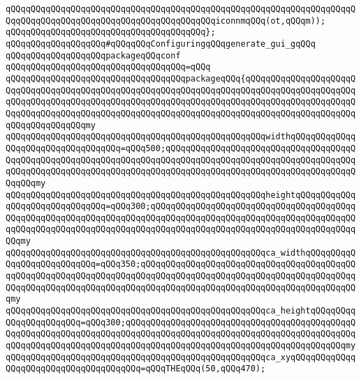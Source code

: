 \verb|qQQqqQQqqQQqqQQqqQQqqQQqqQQqqQQqqQQqqQQqqQQqqQQqqQQqqQQqqQQqqQQqqQQqqQQqqQQqqQQqqQQqqQQqqQQqqQQqqQQqqQQqqQQqqQQqiconnmqQQq(ot,qQQqm));|\newline
\verb|qQQqqQQqqQQqqQQqqQQqqQQqqQQqqQQqqQQqqQQq};|\newline
\newline
\verb|qQQqqQQqqQQqqQQqqQQq#qQQqqQQqConfiguringqQQqgenerate_gui_gqQQq|\newline
\newline
\verb|qQQqqQQqqQQqqQQqqQQqpackageqQQqconf|\newline
\verb|qQQqqQQqqQQqqQQqqQQqqQQqqQQqqQQqqQQq=qQQq|\newline
\verb|qQQqqQQqqQQqqQQqqQQqqQQqqQQqqQQqqQQqpackageqQQq{qQQqqQQqqQQqqQQqqQQqqQQqqQQqqQQqqQQqqQQqqQQqqQQqqQQqqQQqqQQqqQQqqQQqqQQqqQQqqQQqqQQqqQQqqQQqqQQqqQQqqQQqqQQqqQQqqQQqqQQqqQQqqQQqqQQqqQQqqQQqqQQqqQQqqQQqqQQqqQQqqQQqqQQqqQQqqQQqqQQqqQQqqQQqqQQqqQQqqQQqqQQqqQQqqQQqqQQqqQQqqQQqqQQqqQQqqQQqqQQqqQQqqQQqmy|\newline
\verb|qQQqqQQqqQQqqQQqqQQqqQQqqQQqqQQqqQQqqQQqqQQqqQQqqQQqwidthqQQqqQQqqQQqqQQqqQQqqQQqqQQqqQQqqQQq=qQQq500;qQQqqQQqqQQqqQQqqQQqqQQqqQQqqQQqqQQqqQQqqQQqqQQqqQQqqQQqqQQqqQQqqQQqqQQqqQQqqQQqqQQqqQQqqQQqqQQqqQQqqQQqqQQqqQQqqQQqqQQqqQQqqQQqqQQqqQQqqQQqqQQqqQQqqQQqqQQqqQQqqQQqqQQqqQQqqQQqqQQqqQQqmy|\newline
\verb|qQQqqQQqqQQqqQQqqQQqqQQqqQQqqQQqqQQqqQQqqQQqqQQqqQQqheightqQQqqQQqqQQqqQQqqQQqqQQqqQQqqQQq=qQQq300;qQQqqQQqqQQqqQQqqQQqqQQqqQQqqQQqqQQqqQQqqQQqqQQqqQQqqQQqqQQqqQQqqQQqqQQqqQQqqQQqqQQqqQQqqQQqqQQqqQQqqQQqqQQqqQQqqQQqqQQqqQQqqQQqqQQqqQQqqQQqqQQqqQQqqQQqqQQqqQQqqQQqqQQqqQQqqQQqqQQqqQQqmy|\newline
\verb|qQQqqQQqqQQqqQQqqQQqqQQqqQQqqQQqqQQqqQQqqQQqqQQqqQQqca_widthqQQqqQQqqQQqqQQqqQQqqQQqqQQq=qQQq350;qQQqqQQqqQQqqQQqqQQqqQQqqQQqqQQqqQQqqQQqqQQqqQQqqQQqqQQqqQQqqQQqqQQqqQQqqQQqqQQqqQQqqQQqqQQqqQQqqQQqqQQqqQQqqQQqqQQqqQQqqQQqqQQqqQQqqQQqqQQqqQQqqQQqqQQqqQQqqQQqqQQqqQQqqQQqqQQqqQQqqQQqmy|\newline
\verb|qQQqqQQqqQQqqQQqqQQqqQQqqQQqqQQqqQQqqQQqqQQqqQQqqQQqca_heightqQQqqQQqqQQqqQQqqQQqqQQq=qQQq300;qQQqqQQqqQQqqQQqqQQqqQQqqQQqqQQqqQQqqQQqqQQqqQQqqQQqqQQqqQQqqQQqqQQqqQQqqQQqqQQqqQQqqQQqqQQqqQQqqQQqqQQqqQQqqQQqqQQqqQQqqQQqqQQqqQQqqQQqqQQqqQQqqQQqqQQqqQQqqQQqqQQqqQQqqQQqqQQqqQQqqQQqmy|\newline
\verb|qQQqqQQqqQQqqQQqqQQqqQQqqQQqqQQqqQQqqQQqqQQqqQQqqQQqca_xyqQQqqQQqqQQqqQQqqQQqqQQqqQQqqQQqqQQqqQQq=qQQqTHEqQQq(50,qQQq470);|\newline
\newline
